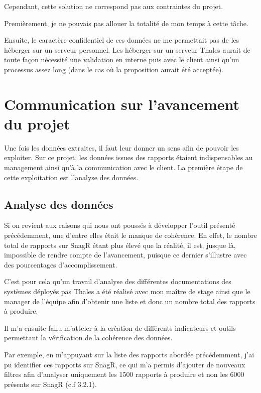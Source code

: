 Cependant, cette solution ne correspond pas aux contraintes du projet.

Premièrement, je ne pouvais pas allouer la totalité de mon temps à cette tâche.

Ensuite, le caractère confidentiel de ces données ne me permettait pas de les héberger sur un serveur personnel. Les héberger sur un serveur Thales aurait de toute façon nécessité une validation en interne puis avec le client ainsi qu'un processus assez long (dans le cas où la proposition aurait été acceptée).


\newpage
\section{Communication sur l'avancement du projet}

Une fois les données extraites, il faut leur donner un sens afin de pouvoir les exploiter. Sur ce projet, les données issues des rapports étaient indispensables au management ainsi qu'à la communication avec le client. La première étape de cette exploitation est l'analyse des données.

\subsection{Analyse des données}
Si on revient aux raisons qui nous ont poussés à développer l'outil présenté précédemment, une d'entre elles était le manque de cohérence.
En effet, le nombre total de rapports sur \gls{SnagR} étant plus élevé que la réalité, il est, jusque là, impossible de rendre compte de l'avancement, puisque ce dernier s'illustre avec des pourcentages d'accomplissement.

C'est pour cela qu'un travail d'analyse des différentes documentations des systèmes déployés pas Thales a été réalisé avec mon maître de stage ainsi que le manager de l'équipe afin d'obtenir une liste et donc un nombre total des rapports à produire.

Il m'a ensuite fallu m'atteler à la création de différents indicateurs et outils permettant la vérification de la cohérence des données.

Par exemple, en m'appuyant sur la liste des rapports abordée précédemment, j'ai pu identifier ces rapports sur \gls{SnagR}, ce qui m'a permis d'ajouter de nouveaux filtres afin d'analyser uniquement les 1500 rapports à produire et non les 6000 présents sur \gls{SnagR} (c.f 3.2.1).

